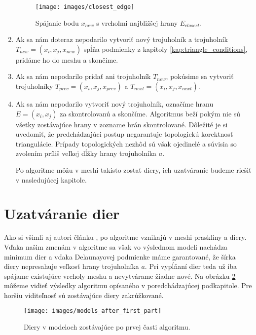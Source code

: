 \begin{enumerate}
{        \begin{figure}
            \centerline{\texttt{[image: images/closest\_edge]}}
            \caption[Spájanie bodu $x_{new}$ s vrcholmi najbližšej hrany]{Spájanie bodu $x_{new}$ s vrcholmi najbližšej hrany $E_{closest}$.}
            \label{obr:closest_edge}
        \end{figure}
    }
    \item{
        Ak sa nám doteraz nepodarilo vytvoriť nový trojuholník a trojuholník $T_{new} = (x_i, x_j, x_{new})$
        spĺňa podmienky z kapitoly \ref{kap:triangle_conditions}, pridáme ho do meshu a skončíme.
    }
    \item{
        Ak sa nám nepodarilo pridať ani trojuholník $T_{new}$, pokúsime sa vytvoriť trojuholníky 
        $T_{prev} = (x_i, x_j, x_{prev})$ a $T_{next} = (x_i, x_j, x_{next})$.
    }
    \item{
        Ak sa nám nepodarilo vytvoriť nový trojuholník, označíme hranu $E = (x_i, x_j)$ za skontrolovanú
        a skončíme.
    }
    Algoritmus beží pokým nie sú všetky zostávajúce hrany v zozname hrán skontrolované. 
    Dôležité je si uvedomiť, že predchádzajúci postup negarantuje topologickú korektnosť
    triangulácie. Prípady topologických nezhôd sú však ojedinelé a súvisia so zvolením príliš
    veľkej dĺžky hrany trojuholníka $a$.

    Po algoritme môžu v meshi takisto zostať diery, ich uzatváranie budeme riešiť v nasledujúcej kapitole.
\end{enumerate}

\section{Uzatváranie dier}
\label{kap:second_part_of_algorithm}
Ako si všimli aj autori článku \cite{akkouche2001adaptive}, po algoritme vznikajú v meshi 
praskliny a diery. Vďaka našim zmenám v algoritme sa však vo výslednom modeli nachádza minimum dier 
a vďaka Delaunayovej podmienke máme garantované, že šírka diery nepresahuje veľkosť hrany trojuholníka
$a$. Pri vypĺňaní dier teda už iba spájame existujúce vrcholy meshu a nevytvárame žiadne nové.
Na obrázku \ref{obr:models_after_first_part} môžeme vidieť výsledky algoritmu opísaného v 
poredchádzajúcej podkapitole. Pre horšiu viditeľnosť sú zostávajúce diery zakrúžkované.

\begin{figure}
    \centerline{\texttt{[image: images/models\_after\_first\_part]}}
    \caption[Diery v modeloch]{Diery v modeloch zostávajúce po prvej časti algoritmu.}
    \label{obr:models_after_first_part}
\end{figure}


